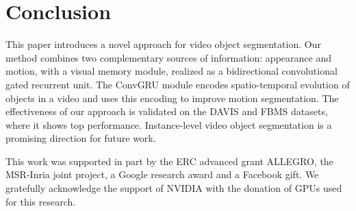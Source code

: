 \documentclass[10pt,twocolumn,letterpaper]{article}
\begin{document}
\section{Conclusion}
This paper introduces a novel approach for video object segmentation. Our
method combines two complementary sources of information: appearance and
motion, with a visual memory module, realized as a bidirectional convolutional
gated recurrent unit. The ConvGRU module encodes spatio-temporal evolution of
objects in a video and uses this encoding to improve motion segmentation. The
effectiveness of our approach is validated on the DAVIS and FBMS datasets,
where it shows top performance. Instance-level video object segmentation is a
promising direction for future work.

\vspace{0.2cm}
This work was supported in part by the ERC advanced grant ALLEGRO, the
MSR-Inria joint project, a Google research award and a Facebook gift. We
gratefully acknowledge the support of NVIDIA with the donation of GPUs used for
this research.

{\small


}
\end{document}
